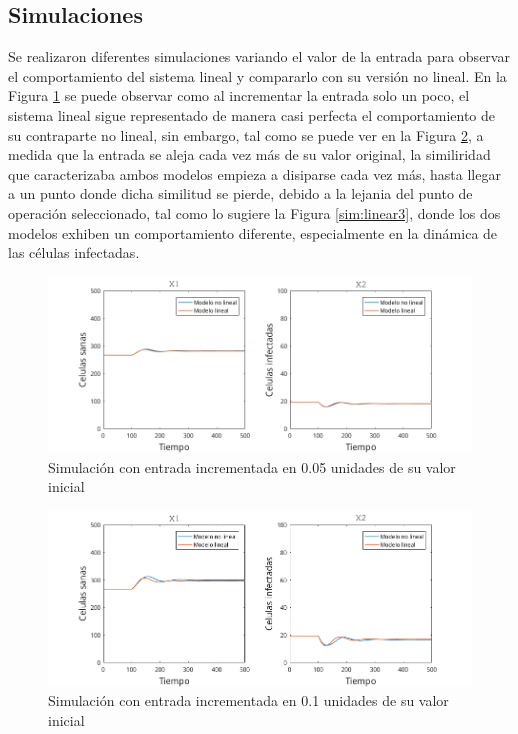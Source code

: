 \documentclass{article}
\begin{document}
\subsection{Simulaciones}

Se realizaron diferentes simulaciones variando el valor de la entrada para
observar el comportamiento del sistema lineal y compararlo con su versión no
lineal. En la Figura \ref{sim:linear1} se puede observar como al incrementar la
entrada solo un poco, el sistema lineal sigue representado de manera casi
perfecta el comportamiento de su contraparte no lineal, sin embargo, tal como
se puede ver en la Figura \ref{sim:linear2}, a medida que la entrada se aleja
cada vez más de su valor original, la similiridad que caracterizaba ambos
modelos empieza a disiparse cada vez más, hasta llegar a un punto donde dicha
similitud se pierde, debido a la lejania del punto de operación seleccionado,
tal como lo sugiere la Figura \ref{sim:linear3}, donde los dos
modelos exhiben un comportamiento diferente, especialmente en la
dinámica de las células infectadas.

\begin{figure}[H]
    \centering
    \includegraphics[scale=0.7]{Images/LinealU15.png}
    \caption{Simulación con entrada incrementada en 0.05 unidades de su valor inicial}
    \label{sim:linear1}
\end{figure}

\begin{figure}[H]
    \includegraphics[width=\textwidth]{Images/LinealU20.png}
    \caption{Simulación con entrada incrementada en 0.1 unidades de su valor inicial}
    \label{sim:linear2}
\end{figure}
\end{document}
